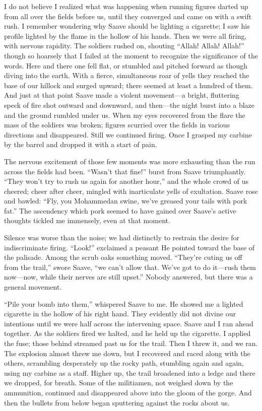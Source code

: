 \documentclass[a5paper,12pt]{book}
\begin{document}
I do not believe I realized what was happening when running figures darted up from all over the fields before us, until they converged and came on with a swift rush. I remember wondering why Saave should be lighting a cigarette; I saw his profile lighted by the flame in the hollow of his hands. Then we were all firing, with nervous rapidity. The soldiers rushed on, shouting “Allah! Allah! Allah!” though so hoarsely that I failed at the moment to recognize the significance of the words. Here and there one fell flat, or stumbled and pitched forward as though diving into the earth. With a fierce, simultaneous roar of yells they reached the base of our hillock and surged upward; there seemed at least a hundred of them. And just at that point Saave made a violent movement—a bright, fluttering speck of fire shot outward and downward, and then—the night burst into a blaze and the ground rumbled under us. When my eyes recovered from the flare the mass of the soldiers was broken; figures scurried over the fields in various directions and disappeared. Still we continued firing. Once I grasped my carbine by the barrel and dropped it with a start of pain.

The nervous excitement of those few moments was more exhausting than the run across the fields had been. “Wasn’t that fine!” burst from Saave triumphantly. “They won’t try to rush us again for another hour,” and the whole crowd of us cheered; cheer after cheer, mingled with inarticulate yells of exultation. Saave rose and bawled: “Fly, you Mohammedan swine, we’ve greased your tails with pork fat.” The ascendency which pork seemed to have gained over Saave’s active thoughts tickled me immensely, even at that moment.

Silence was worse than the noise; we had distinctly to restrain the desire for indiscriminate firing. “Look!” exclaimed a peasant He pointed toward the base of the palisade. Among the scrub oaks something moved. “They’re cuting us off from the trail,” swore Saave, “we can’t allow that. We’ve got to do it—rush them now—now, while their nerves are still upset.” Nobody answered, but there was a general movement.

“Pile your bomb into them,” whispered Saave to me. He showed me a lighted cigarette in the hollow of his right hand. They evidently did not divine our intentions until we were half across the intervening space. Saave and I ran ahead together. As the soldiers fired we halted, and he held up the cigarette. I applied the fuse; those behind streamed past us for the trail. Then I threw it, and we ran.
The explosion almost threw me down, but I recovered and raced along with the others, scrambling desperately up the rocky path, stumbling again and again, using my carbine as a staff. Higher up, the trail broadened into a ledge and there we dropped, for breath. Some of the militiamen, not weighed down by the ammunition, continued and disappeared above into the gloom of the gorge. And then the bullets from below began sputtering against the rocks about us.
\end{document}
